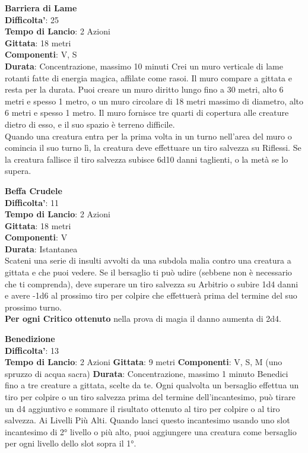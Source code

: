 \begin{multicols}{2}
\medskip\textbf{Barriera di Lame}\\
\textbf{Difficolta'}: 25\\
\textbf{Tempo di Lancio}: 2 Azioni\\
\textbf{Gittata}: 18 metri\\
\textbf{Componenti}: V, S\\
\textbf{Durata}: Concentrazione, massimo 10 minuti Crei un muro verticale di lame rotanti fatte di energia magica, affilate come rasoi. Il muro compare a gittata e resta per la durata. Puoi creare un muro diritto lungo fino a 30 metri, alto 6 metri e spesso 1 metro, o un muro circolare di 18 metri massimo di diametro, alto 6 metri e spesso 1 metro. Il muro fornisce tre quarti di copertura alle creature dietro di esso, e il suo spazio è terreno difficile. \\
Quando una creatura entra per la prima volta in un turno nell’area del muro o comincia il suo turno lì, la creatura deve effettuare un tiro salvezza su Riflessi. Se la creatura fallisce il tiro salvezza subisce 6d10 danni taglienti, o la metà se lo supera.

\medskip\textbf{Beffa Crudele}\\
\textbf{Difficolta'}: 11\\
\textbf{Tempo di Lancio}: 2 Azioni\\
\textbf{Gittata}: 18 metri\\
\textbf{Componenti}: V\\
\textbf{Durata}: Istantanea\\
Scateni una serie di insulti avvolti da una subdola malia contro una creatura a gittata e che puoi vedere. Se il bersaglio ti può udire (sebbene non è necessario che ti comprenda), deve superare un tiro salvezza su Arbitrio o subire 1d4 danni e avere -1d6 al prossimo tiro per colpire che effettuerà prima del termine del suo prossimo turno.\\
\textbf{Per ogni Critico ottenuto} nella prova di magia il danno aumenta di 2d4.

\medskip\textbf{Benedizione}\\
\textbf{Difficolta'}: 13\\
\textbf{Tempo di Lancio}: 2 Azioni
\textbf{Gittata}: 9 metri
\textbf{Componenti}: V, S, M (uno spruzzo di acqua sacra)
\textbf{Durata}: Concentrazione, massimo 1 minuto
Benedici fino a tre creature a gittata, scelte da te. Ogni
qualvolta un bersaglio effettua un tiro per colpire o un
tiro salvezza prima del termine dell’incantesimo, può
tirare un d4 aggiuntivo e sommare il risultato ottenuto al
tiro per colpire o al tiro salvezza.
Ai Livelli Più Alti. Quando lanci questo incantesimo
usando uno slot incantesimo di 2° livello o più alto, puoi
aggiungere una creatura come bersaglio per ogni livello
dello slot sopra il 1°.



\end{multicols}
